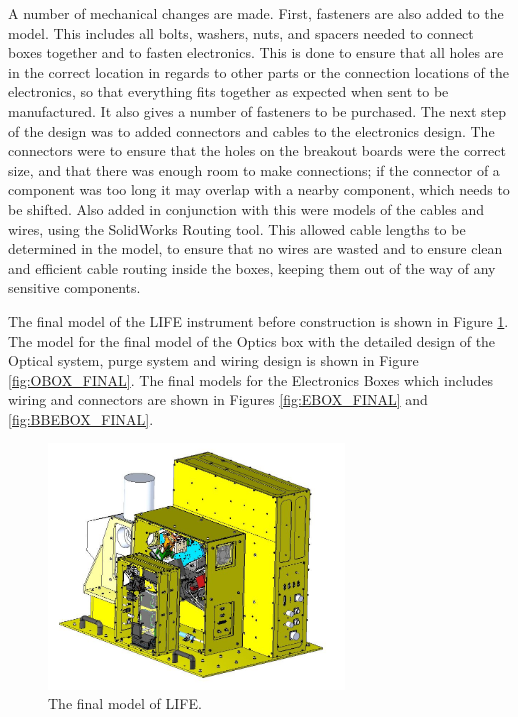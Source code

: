 A number of mechanical changes are made. First, fasteners are also added to the model. This includes all bolts, washers, nuts, and spacers needed to connect boxes together and to fasten electronics. This is done to ensure that all holes are in the correct location in regards to other parts or the connection locations of the electronics, so that everything fits together as expected when sent to be manufactured. It also gives a number of fasteners to be purchased. The next step of the design was to added connectors and cables to the electronics design. The connectors were to ensure that the holes on the breakout boards were the correct size, and that there was enough room to make connections; if the connector of a component was too long it may overlap with a nearby component, which needs to be shifted. Also added in conjunction with this were models of the cables and wires, using the SolidWorks Routing tool. This allowed cable lengths to be determined in the model, to ensure that no wires are wasted and to ensure clean and efficient cable routing inside the boxes, keeping them out of the way of any sensitive components.

The final model of the LIFE instrument before construction is shown in Figure \ref{fig:LIFE_V5_final}. The model for the final model of the Optics box with the detailed design of the Optical system, purge system and wiring design is shown in Figure \ref{fig:OBOX_FINAL}. The final models for the Electronics Boxes which includes wiring and connectors are shown in Figures \ref{fig:EBOX_FINAL} and \ref{fig:BBEBOX_FINAL}.

\begin{figure}
    \centering
    \includegraphics[width=0.7\textwidth]{chap3_images/LIFE_V5_final_images/LIFE_V5_final_img.JPG}
    \caption{The final model of LIFE.}
    \label{fig:LIFE_V5_final}
\end{figure}


